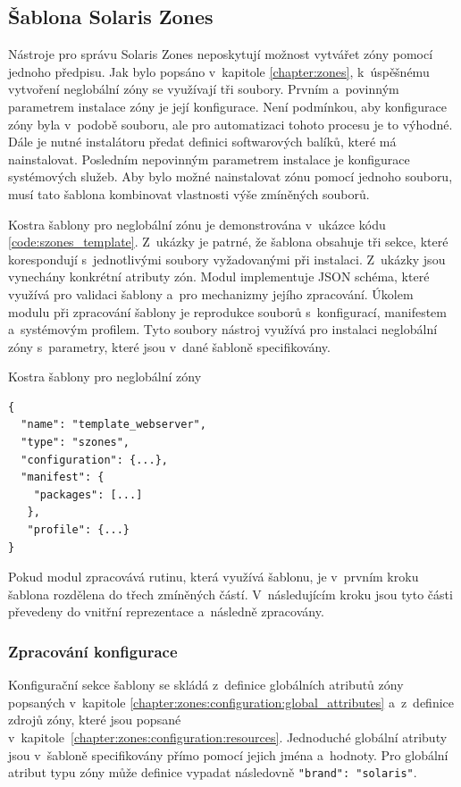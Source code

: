 \subsection{Šablona Solaris Zones}
\label{chapter:implementation:szones:template}
Nástroje pro správu Solaris Zones neposkytují možnost vytvářet zóny pomocí jednoho předpisu. Jak bylo popsáno v~kapitole
\ref{chapter:zones}, k~úspěšnému vytvoření neglobální zóny se využívají tři soubory. Prvním a~povinným parametrem instalace zóny
je její konfigurace. Není podmínkou, aby konfigurace zóny byla v~podobě souboru, ale pro automatizaci tohoto procesu je to výhodné.
Dále je nutné instalátoru předat definici softwarových balíků, které má nainstalovat. Posledním nepovinným parametrem instalace
je konfigurace systémových služeb. Aby bylo možné nainstalovat zónu pomocí jednoho souboru, musí tato šablona kombinovat
vlastnosti výše zmíněných souborů. 

Kostra šablony pro neglobální zónu je demonstrována v~ukázce kódu \ref{code:szones_template}. Z~ukázky je patrné, že šablona obsahuje
tři sekce, které korespondují s~jednotlivými soubory vyžadovanými při instalaci. Z~ukázky jsou vynechány konkrétní atributy zón.
Modul implementuje JSON schéma, které využívá pro validaci šablony a~pro mechanizmy jejího zpracování. Úkolem modulu při zpracování
šablony je reprodukce souborů s~konfigurací, manifestem a~systémovým profilem. Tyto soubory nástroj využívá pro instalaci 
neglobální zóny s~parametry, které jsou v~dané šabloně specifikovány.
\begin{listing}[ht]
  \caption{Kostra šablony pro neglobální zóny}
  \begin{verbatim}
{  
  "name": "template_webserver",
  "type": "szones",
  "configuration": {...},
  "manifest": {
    "packages": [...]
   },
   "profile": {...} 
}
  \end{verbatim} 
  \label{code:szones_template}
\end{listing}
Pokud modul zpracovává rutinu, která využívá šablonu, je v~prvním kroku šablona rozdělena do třech zmíněných částí.
V~následujícím kroku jsou tyto části převedeny do vnitřní reprezentace a~následně zpracovány.
\subsubsection{Zpracování konfigurace}
\label{chapter:implementation:szones:template:configuration}
Konfigurační sekce šablony se skládá z~definice globálních atributů zóny popsaných v~kapitole \ref{chapter:zones:configuration:global_attributes}
a~z~definice zdrojů zóny, které jsou popsané v~kapitole~\ref{chapter:zones:configuration:resources}. Jednoduché globální atributy
jsou v~šabloně specifikovány přímo pomocí jejich jména a~hodnoty. Pro globální atribut typu zóny může definice vypadat 
následovně \texttt{{"brand": "solaris"}}.

